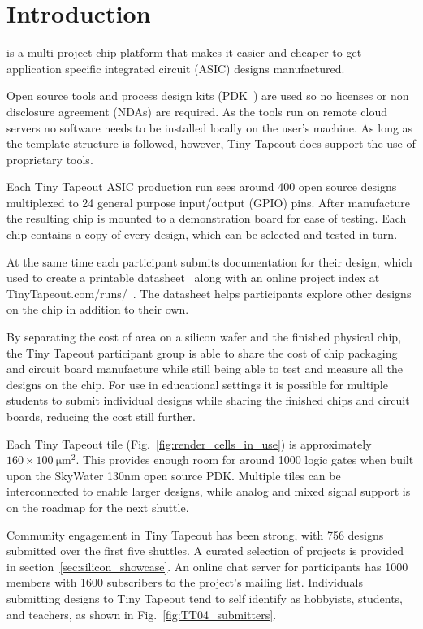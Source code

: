 \section{Introduction}
\label{sec:introduction}
 is a multi project chip platform that makes it easier and cheaper to get application specific integrated circuit (ASIC) designs manufactured.

Open source tools and process design kits (PDK~\cite{pdk}) are used so no licenses or non disclosure agreement (NDAs) are required. As the tools run on remote cloud servers no software needs to be installed locally on the user's machine. As long as the template structure is followed, however, Tiny Tapeout does support the use of proprietary tools.

Each Tiny Tapeout ASIC production run sees around 400 open source designs multiplexed to 24 general purpose input/output (GPIO) pins. After manufacture the resulting chip is mounted to a demonstration board for ease of testing. Each chip contains a copy of every design, which can be selected and tested in turn.

At the same time each participant submits documentation for their design, which used to create a printable datasheet~\cite{datasheet} along with an online project index at TinyTapeout.com/runs/~\cite{tinytapeoutruns}. The datasheet helps participants explore other designs on the chip in addition to their own.

By separating the cost of area on a silicon wafer and the finished physical chip, the Tiny Tapeout participant group is able to share the cost of chip packaging and circuit board manufacture while still being able to test and measure all the designs on the chip. For use in educational settings it is possible for multiple students to submit individual designs while sharing the finished chips and circuit boards, reducing the cost still further.

Each Tiny Tapeout tile (Fig.~\ref{fig:render_cells_in_use}) is approximately $160 \times \qty{100}{\micro\meter\squared}$. This provides enough room for around 1000 logic gates when built upon the SkyWater 130nm open source PDK. Multiple tiles can be interconnected to enable larger designs, while analog and mixed signal support is on the roadmap for the next shuttle.

Community engagement in Tiny Tapeout has been strong, with 756 designs submitted over the first five shuttles. A curated selection of projects is provided in section~\ref{sec:silicon_showcase}.
An online chat server for participants has 1000 members with 1600 subscribers to the project's mailing list. Individuals submitting designs to Tiny Tapeout tend to self identify as hobbyists, students, and teachers, as shown in Fig.~\ref{fig:TT04_submitters}.

